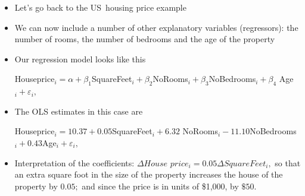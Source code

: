 \documentclass[notes=show]{beamer}
\begin{document}
\begin{frame}%


\begin{itemize}
\item Let's go back to the US\ housing price example

\item We can now include a number of other explanatory variables
(regressors): the number of rooms, the number of bedrooms and the age of the
property

\item Our regression model looks like this

{\small Houseprice}$_{i}=\alpha +\beta _{1}${\small SquareFeet}$_{i}+\beta
_{2}${\small NoRooms}$_{i}+\beta _{3}${\small NoBedrooms}$_{i}+\beta _{4}$%
{\small Age}$_{i}+\varepsilon _{i},$

\item The OLS estimates in this case are

{\small Houseprice}$_{i}=10.37+0.05${\small SquareFeet}$_{i}+6.32${\small %
NoRooms}$_{i}-11.10${\small NoBedrooms}$_{i}+0.43${\small Age}$%
_{i}+\varepsilon _{i},$

\item Interpretation of the coefficients: $\Delta House$ $%
price_{i}=0.05\Delta SquareFeet_{i},$ so that an extra square foot in the
size of the property increases the house of the property by $0.05;$ and
since the price is in units of \$1,000, by $\$50.$
\end{itemize}

\end{frame}%
\end{document}
